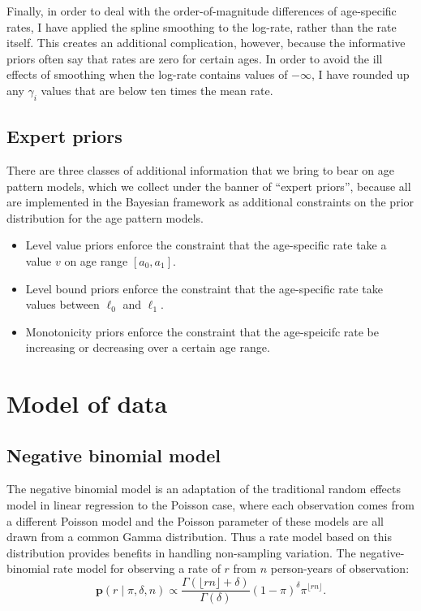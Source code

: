 \documentclass[12pt]{article}
\newcommand{\1}{\mathbf{1}}
\newcommand{\0}{\mathbf{0}}
\newcommand{\given}{\;|\;}
\newcommand{\dens}{\mathbf{p}}
\begin{document}
Finally, in order to deal with the order-of-magnitude differences of
age-specific rates, I have applied the spline smoothing to the
log-rate, rather than the rate itself.  This creates an additional
complication, however, because the informative priors often say that
rates are zero for certain ages.  In order to avoid the ill effects of
smoothing when the log-rate contains values of $-\infty$, I have
rounded up any $\gamma_i$ values that are below ten times the mean
rate.


\subsection{Expert priors}
There are three classes of additional information that we bring to
bear on age pattern models, which we collect under the banner of
``expert priors'', because all are implemented in the Bayesian
framework as additional constraints on the prior distribution for the
age pattern models.
\begin{itemize}
\item Level value priors enforce the constraint that the age-specific
rate take a value $v$ on age range $[a_0,a_1]$.  
\item Level bound priors enforce the constraint that the age-specific rate
take values between $\ell_0$ and $\ell_1$.
\item Monotonicity priors enforce the constraint that the age-speicifc
  rate be increasing or decreasing over a certain age range.
\end{itemize}

\section{Model of data}
\label{data}
\subsection{Negative binomial model}
The negative binomial model is an adaptation of the traditional random
effects model in linear regression to the Poisson case, where each
observation comes from a different Poisson model and the Poisson
parameter of these models are all drawn from a common Gamma
distribution. Thus a rate model based on this distribution provides
benefits in handling non-sampling variation.  The negative-binomial
rate model for observing a rate of $r$ from $n$ person-years of observation:
\[
\dens(r\given \pi, \delta, n) \propto
 \frac{\Gamma(\lfloor rn \rfloor+\delta)}{\Gamma(\delta)} (1-\pi)^\delta \pi^{\lfloor rn\rfloor}.
\]
\end{document}
